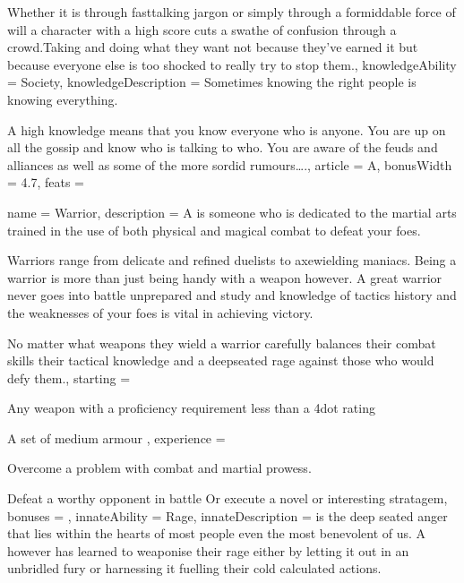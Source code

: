 {Whether it is through fast\minus{}talking jargon\comma{} or simply through a formiddable force of will\comma{} a character with a high  score cuts a swathe of confusion through a crowd.Taking and doing what they want not because they’ve earned it\comma{} but because everyone else is too shocked to really try to stop them.,
	knowledgeAbility = Society,
	knowledgeDescription = Sometimes\comma{} knowing the right people is knowing everything. 

A high  knowledge means that you know everyone who is anyone. You are up on all the gossip and know who is talking to who. You are aware of the feuds and alliances\comma{} as well as some of the more sordid rumours….,
	article = A,
	bonusWidth = 4.7, feats = \SophisticateFeats
}

\archetype
{
	name = Warrior,
	description = A \bname{} is someone who is dedicated to the martial arts\comma{} trained in the use of both physical and magical combat to defeat your foes. 

Warriors range from delicate and refined duelists\comma{} to axe\minus{}wielding maniacs. Being a warrior is more than just being handy with a weapon\comma{} however. A great warrior never goes into battle unprepared\comma{} and study and knowledge of tactics\comma{} history and the weaknesses of your foes is vital in achieving victory. 

No matter what weapons they wield\comma{} a warrior carefully balances their combat skills\comma{} their tactical knowledge and a deep\minus{}seated rage against those who would defy them.,
	starting = 
\item Any weapon with a proficiency requirement less than a 4\minus{}dot rating
\item A set of medium armour
,
	experience = \item Overcome a problem with combat and martial prowess.
\item Defeat a worthy opponent in battle
Or execute a novel or interesting stratagem,
	bonuses = 
,
	innateAbility = Rage,
	innateDescription =  is the deep seated anger that lies within the hearts of most people\comma{} even the most benevolent of us. A \bname{}\comma{} however\comma{} has learned to weaponise their rage\comma{} either by letting it out in an unbridled fury\comma{} or harnessing it\comma{} fuelling their cold\comma{} calculated actions. 

}
